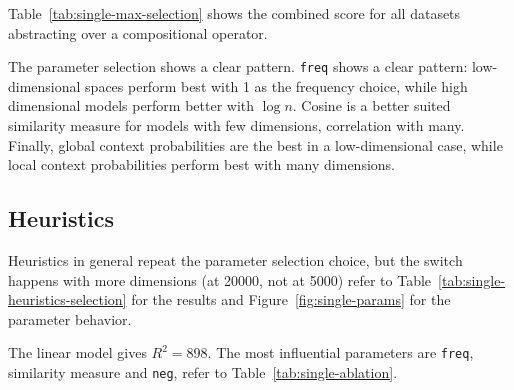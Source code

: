 Table~\ref{tab:single-max-selection} shows  the combined score for all datasets abstracting over a compositional operator.

The parameter selection shows a clear pattern. \texttt{freq} shows a clear pattern: low-dimensional spaces perform best with 1 as the frequency choice, while high dimensional models perform better with $\log n$. Cosine is a better suited similarity measure for models with few dimensions, correlation with many. Finally, global context probabilities are the best in a low-dimensional case, while local context probabilities perform best with many dimensions.


\subsection{Heuristics}
\label{sec:heuristics-single}

Heuristics in general repeat the parameter selection choice, but the switch happens with more dimensions (at 20000, not at 5000) refer to Table~\ref{tab:single-heuristics-selection} for the results and Figure~\ref{fig:single-params} for the parameter behavior.


The linear model gives $R^2 = 898$. The most influential parameters are \texttt{freq}, similarity measure and \texttt{neg}, refer to Table~\ref{tab:single-ablation}.






